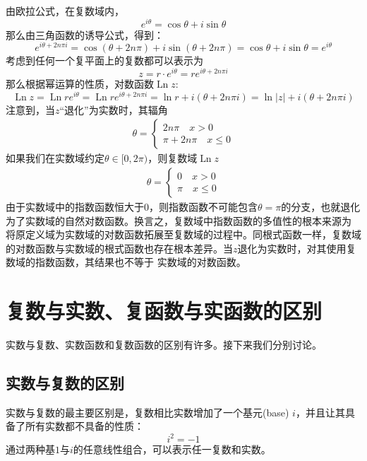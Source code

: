 \documentclass[12pt, a4paper, oneside]{ctexart}
\begin{document}
由欧拉公式，在复数域内，
$$
e^{i\theta}=\cos \theta + i \sin \theta
$$
那么由三角函数的诱导公式，得到：
$$
e^{i\theta+2n\pi i}=\cos (\theta+2n\pi) + i \sin (\theta+2n\pi)=\cos \theta + i \sin \theta=e^{i\theta}
$$
考虑到任何一个复平面上的复数都可以表示为
$$
z=r\cdot e^{i\theta}=re^{i\theta+2n\pi i}
$$
那么根据幂运算的性质，对数函数$\operatorname{Ln} z$:
$$
\operatorname{Ln} z = \operatorname{Ln} r  e^{i\theta} = \operatorname{Ln} r e^{i\theta + 2n\pi i} = \ln r + i(\theta+2n\pi i) = \ln |z| + i(\theta+2n\pi i)
$$
注意到，当$z$“退化”为实数时，其辐角
\begin{align*}
    \theta = 
    \begin{cases}
        2n\pi\quad x > 0\\
        \pi+2n\pi \quad x\le 0
    \end{cases}
\end{align*}
如果我们在实数域约定$\theta \in [0,2\pi)$，则复数域$\operatorname{Ln} z$
\begin{align*}
    \theta = 
    \begin{cases}
        0\quad x > 0\\
        \pi \quad x\le 0
    \end{cases}
\end{align*}
由于实数域中的指数函数恒大于0，则指数函数不可能包含$\theta=\pi$的分支，也就退化为了实数域的自然对数函数。换言之，复数域中指数函数的多值性的根本来源为
将原定义域为实数域的对数函数拓展至复数域的过程中。同根式函数一样，复数域的对数函数与实数域的根式函数也存在根本差异。当$z$退化为实数时，对其使用复数域的指数函数，其结果也不等于
实数域的对数函数。
\section{复数与实数、复函数与实函数的区别}
实数与复数、实数函数和复数函数的区别有许多。接下来我们分别讨论。
\subsection{实数与复数的区别}
实数与复数的最主要区别是，复数相比实数增加了一个基元(base) $i$，并且让其具备了所有实数都不具备的性质：
$$
i^2=-1
$$
通过两种基$1$与$i$的任意线性组合，可以表示任一复数和实数。
\end{document}
